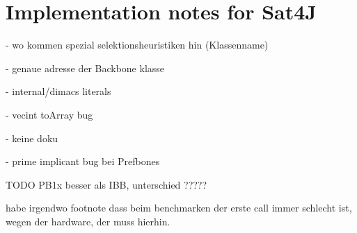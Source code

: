 \section{Implementation notes for Sat4J}


- wo kommen spezial selektionsheuristiken hin (Klassenname)

- genaue adresse der Backbone klasse

- internal/dimacs literals

- vecint toArray bug

- keine doku

- prime implicant bug bei Prefbones

TODO PB1x besser als IBB, unterschied ?????

habe irgendwo footnote dass beim benchmarken der erste call immer schlecht ist, wegen der hardware, der muss hierhin.